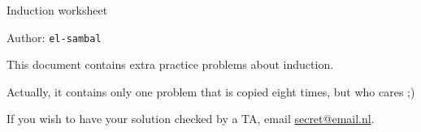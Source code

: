 \documentclass[answers]{exercises}
\begin{document}
\begin{center}
	{\LARGE Induction worksheet}

	\vspace{3mm}
	{\large Author: \texttt{el-sambal}}
\end{center}
\vspace{5mm}

\begin{instructions}
	This document contains extra practice problems about induction.

    \vspace{2mm}
    Actually, it contains only one problem that is copied eight times, but who cares ;)

	\vspace{2mm}
	If you wish to have your solution checked by a TA, email \href{mailto:secret@email.nl}{secret@email.nl}.
\end{instructions}
\end{document}
